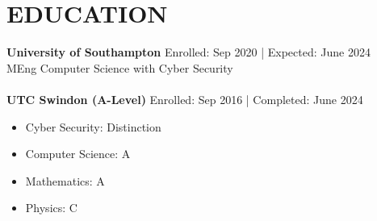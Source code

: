 \section*{EDUCATION}
\noindent
\textbf{University of Southampton} \hfill Enrolled: Sep 2020 | Expected: June 2024\\ %
MEng Computer Science with Cyber Security\\
\\
\textbf{UTC Swindon (A-Level)} \hfill Enrolled: Sep 2016 | Completed: June 2024
\begin{itemize}
    \item Cyber Security: Distinction
    \item Computer Science: A
    \item Mathematics: A
    \item Physics: C
\end{itemize}

